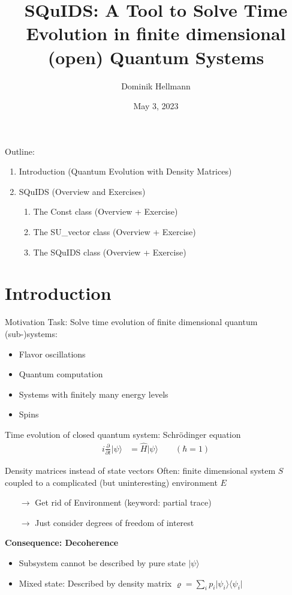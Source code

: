 \documentclass[]{beamer}
\title{\Large SQuIDS: A Tool to Solve Time Evolution in finite dimensional (open) Quantum Systems\\\vspace*{0.5cm}{\small An Application to Neutrino Oscillations\\\href{https://arxiv.org/abs/1412.3832.pdf}{arxiv:1412.3832}}}
\author{Dominik Hellmann}
\institute[TU Dortmund]{\scriptsize TU Dortmund\\WG Päs
}
\date{May 3, 2023}
\begin{document}
\nocite{*}


\frame{\titlepage}

\begin{frame}
  Outline:
  \begin{enumerate}
    \item Introduction (Quantum Evolution with Density Matrices)
    \item SQuIDS (Overview and Exercises)
    \begin{enumerate}
      \item The Const class (Overview + Exercise)
      \item The SU\_vector class (Overview + Exercise)
      \item The SQuIDS class (Overview + Exercise)
    \end{enumerate}
  \end{enumerate}
\end{frame}

\section{Introduction}

\begin{frame}{Motivation}
  Task: Solve time evolution of finite dimensional quantum (sub-)systems:
  \begin{itemize}
    \item Flavor oscillations
    \item Quantum computation
    \item Systems with finitely many energy levels
    \item Spins
  \end{itemize}
  Time evolution of closed quantum system: Schrödinger equation
  \begin{align}
    i \frac{\partial}{\partial t} \vert \psi \rangle &= \hat{H} \vert \psi \rangle \qquad (\hbar = 1)
  \end{align} 
\end{frame}

\begin{frame}{Density matrices instead of state vectors}
  Often: finite dimensional system \(S\) coupled to a complicated (but uninteresting) environment \(E\)
  \begin{itemize}
    \item[\(\rightarrow\)] Get rid of Environment (keyword: partial trace)
    \item[\(\rightarrow\)] Just consider degrees of freedom of interest
  \end{itemize}
  \textbf{Consequence: Decoherence}
  \begin{itemize}
    \item Subsystem cannot be described by pure state \(\vert \psi \rangle\)
    \item Mixed state: Described by density matrix \(\varrho = \sum_{i} p_i \vert \psi_i \rangle \langle \psi_i \vert\)
  \end{itemize}
\end{frame}
\end{document}
